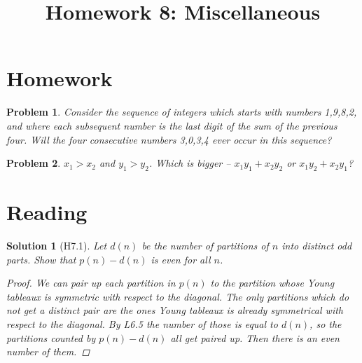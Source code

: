 \documentclass[a4paper,12pt]{article}
\title{Homework 8: Miscellaneous}
\theoremstyle{perfect}
\newtheorem{prb}{Problem}
\newtheorem{sol}{Solution}
\begin{document}
 
\maketitle

\section{Homework}

\begin{prb}
Consider the sequence of integers which starts with numbers 1,9,8,2, and where each subsequent number is the last digit of the sum of the previous four. Will the four consecutive numbers 3,0,3,4 ever occur in this sequence?
\end{prb}

\begin{prb}
$x_1 > x_2$ and $y_1 > y_2$. Which is bigger -- $x_1y_1 + x_2y_2$ or $x_1y_2 + x_2y_1$?
\end{prb}

\section{Reading}

\begin{sol}[H7.1]
\textit{Let $d(n)$ be the number of partitions of $n$ into distinct odd parts. Show that $p(n) - d(n)$ is even for all $n$.}
\begin{proof}
We can pair up each partition in $p(n)$ to the partition whose Young tableaux is symmetric with respect to the diagonal. The only partitions which do not get a distinct pair are the ones Young tableaux is already symmetrical with respect to the diagonal. By L6.5 the number of those is equal to $d(n)$, so the partitions counted by $p(n) - d(n)$ all get paired up. Then there is an even number of them.
\end{proof}
\end{sol}
\end{document}
